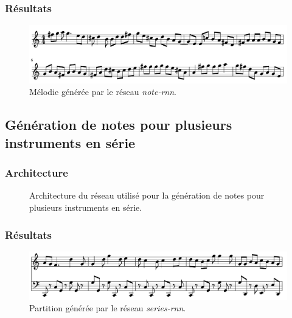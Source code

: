 \subsubsection{Résultats}

\begin{figure}[h!]
\begin{center}
\includegraphics[scale=0.3]{images/chapter9/note_rnn_result.png}
\caption{Mélodie générée par le réseau \textit{note-rnn}.}
\end{center}
\end{figure}

\subsection{Génération de notes pour plusieurs instruments en série}

\subsubsection{Architecture}

\begin{figure}[h!]
\begin{center}

\caption{Architecture du réseau utilisé pour la génération de notes pour plusieurs instruments en série.}
\end{center}
\end{figure}

\subsubsection{Résultats}

\begin{figure}[h!]
\begin{center}
\includegraphics[scale=0.3]{images/chapter9/series_rnn_result.png}
\caption{Partition générée par le réseau \textit{series-rnn}.}
\end{center}
\end{figure}

